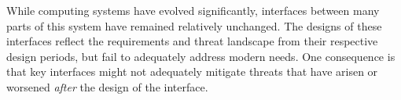 While computing systems have evolved significantly, interfaces between many 
parts of this system have remained relatively unchanged.
The designs of these interfaces reflect the requirements and threat landscape
from their respective design periods, but fail to adequately address modern
needs.
One consequence is that key interfaces might not adequately mitigate threats
that have arisen or worsened \emph{after} the design of the interface.
